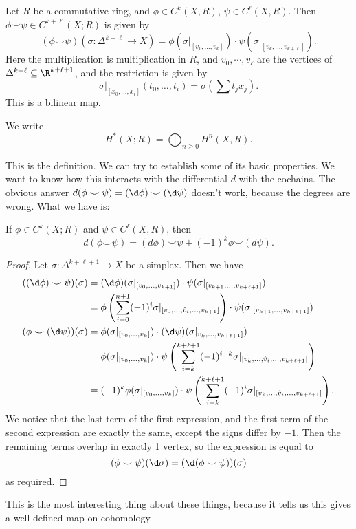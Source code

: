 \documentclass[a4paper]{article}
\begin{document}
\begin{defi}\index{$\smile$}
  Let $R$ be a commutative ring, and $\phi \in C^k(X, R)$, $\psi \in C^\ell(X, R)$. Then $\phi \smile \psi \in C^{k + \ell}(X; R)$ is given by
  \[
    (\phi \smile \psi)(\sigma: \Delta^{k + \ell} \to X) = \phi(\sigma|_{[v_1, \ldots, v_k]}) \cdot \psi(\sigma|_{[v_k, \ldots, v_{k + \ell}]}).
  \]
  Here the multiplication is multiplication in $R$, and $v_0, \cdots, v_\ell$ are the vertices of $\Delta^{k + \ell} \subseteq \R^{k + \ell + 1}$, and the restriction is given by
  \[
    \sigma|_{[x_0, \ldots, x_i]} (t_0, \ldots, t_i) = \sigma\left(\sum t_j x_j\right).
  \]
  This is a bilinear map.
\end{defi}

\begin{notation}
  We write
  \[
    H^*(X; R) = \bigoplus_{n \geq 0} H^n(X, R).
  \]
\end{notation}
This is the definition. We can try to establish some of its basic properties. We want to know how this interacts with the differential $d$ with the cochains. The obvious answer $d(\phi \smile \psi) = (\d \phi) \smile (\d \psi)$ doesn't work, because the degrees are wrong. What we have is:

\begin{lemma}
  If $\phi \in C^k(X; R)$ and $\psi \in C^\ell(X, R)$, then
  \[
    d (\phi \smile \psi) = (d \phi)\smile \psi + (-1)^k \phi\smile(d \psi).
  \]
\end{lemma}

\begin{proof}
  Let $\sigma: \Delta^{k + \ell + 1} \to X$ be a simplex. Then we have
  \begin{align*}
    ((\d \phi)\smile \psi)(\sigma) &= (\d \phi)(\sigma|_{[v_0, \ldots, v_{k + 1}]}) \cdot \psi(\sigma|_{[v_{k + 1}, \ldots, v_{k + \ell + 1}]})\\
    &= \phi\left(\sum_{i = 0}^{n + 1} (-1)^i \sigma|_{[v_0, \ldots, \hat{v}_i, \ldots, v_{k + 1}]}\right) \cdot \psi(\sigma|_{[v_{k + 1}, \ldots, v_{k + \ell + 1}]})\\
    (\phi \smile (\d \psi))(\sigma) &= \phi(\sigma|_{[v_0, \ldots, v_k]}) \cdot (\d \psi)(\sigma|_{v_k,\ldots, v_{k + \ell + 1}]})\\
    &=\phi(\sigma|_{[v_0, \ldots, v_k]}) \cdot \psi\left(\sum_{i = k}^{k + \ell + 1} (-1)^{i - k} \sigma|_{[v_k, \ldots, \hat{v}_i, \ldots, v_{k + \ell + 1}]}\right)\\
    &=(-1)^k \phi(\sigma|_{[v_0, \ldots, v_k]}) \cdot \psi\left(\sum_{i = k}^{k + \ell + 1} (-1)^{i} \sigma|_{[v_k, \ldots, \hat{v}_i, \ldots, v_{k + \ell + 1}]}\right).
  \end{align*}
  We notice that the last term of the first expression, and the first term of the second expression are exactly the same, except the signs differ by $-1$. Then the remaining terms overlap in exactly 1 vertex, so the expression is equal to
  \[
    (\phi \smile \psi)(\d \sigma) = (\d (\phi \smile \psi))(\sigma)
  \]
  as required.
\end{proof}
This is the most interesting thing about these things, because it tells us this gives a well-defined map on cohomology.
\end{document}
